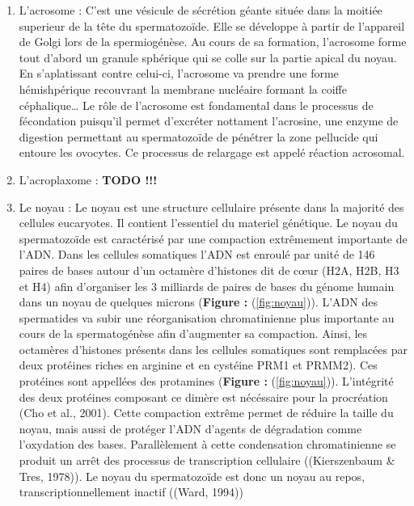 \documentclass[12pt,twoside]{reedthesis}
\providecommand{\tightlist}{%
  \setlength{\itemsep}{0pt}\setlength{\parskip}{0pt}}
\theoremstyle{definition}
\theoremstyle{definition}
\theoremstyle{remark}
\begin{document}
  \begin{enumerate}
  \def\labelenumi{\arabic{enumi}.}
  \tightlist
  \item
    L'acrosome : C'est une vésicule de sécrétion géante située dans la
    moitiée superieur de la tête du spermatozoïde. Elle se développe à
    partir de l'appareil de Golgi lors de la spermiogénèse. Au cours de sa
    formation, l'acrosome forme tout d'abord un granule sphérique qui se
    colle sur la partie apical du noyau. En s'aplatissant contre celui-ci,
    l'acrosome va prendre une forme hémishpérique recouvrant la membrane
    nucléaire formant la coiffe céphalique\ldots{} Le rôle de l'acrosome
    est fondamental dans le processus de fécondation puisqu'il permet
    d'excréter nottament l'acrosine, une enzyme de digestion permettant au
    spermatozoïde de pénétrer la zone pellucide qui entoure les ovocytes.
    Ce processus de relargage est appelé réaction acrosomal.\\
  \item
    L'acroplaxome : \textbf{TODO !!!}\\
  \item
    Le noyau : Le noyau est une structure cellulaire présente dans la
    majorité des cellules eucaryotes. Il contient l'essentiel du materiel
    génétique. Le noyau du spermatozoïde est caractérisé par une
    compaction extrêmement importante de l'ADN. Dans les cellules
    somatiques l'ADN est enroulé par unité de 146 paires de bases autour
    d'un octamère d'histones dit de cœur (H2A, H2B, H3 et H4) afin
    d'organiser les 3 milliards de paires de bases du génome humain dans
    un noyau de quelques microns (\textbf{Figure : }(\ref{fig:noyau})).
    L'ADN des spermatides va subir une réorganisation chromatinienne plus
    importante au cours de la spermatogénèse afin d'augmenter sa
    compaction. Ainsi, les octamères d'histones présents dans les cellules
    somatiques sont remplacées par deux protéines riches en arginine et en
    cystéine PRM1 et PRMM2). Ces protéines sont appellées des protamines
    (\textbf{Figure : }(\ref{fig:noyau})). L'intégrité des deux protéines
    composant ce dimère est nécéssaire pour la procréation (Cho et al.,
    2001). Cette compaction extrême permet de réduire la taille du noyau,
    mais aussi de protéger l'ADN d'agents de dégradation comme l'oxydation
    des bases. Parallèlement à cette condensation chromatinienne se
    produit un arrêt des processus de transcription cellulaire
    ((Kierszenbaum \& Tres, 1978)). Le noyau du spermatozoïde est donc un
    noyau au repos, transcriptionnellement inactif ((Ward, 1994))
  \end{enumerate}
  
\end{document}

